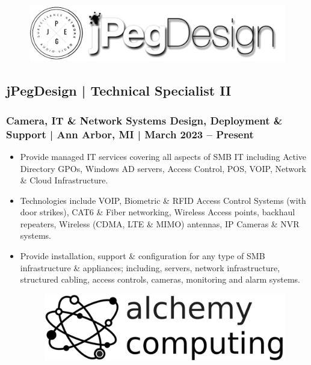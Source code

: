\documentclass[letter,10pt]{article}
\begin{document}
\begin{figure}
\includegraphics[width=0.8\linewidth]{./img/jpeg_banner.jpg}
\end{figure}

\subsection*{jPegDesign | Technical Specialist II}
\label{sec:orgf91f39a}
\subsubsection*{Camera, IT \& Network Systems Design, Deployment \& Support | Ann Arbor, MI | March 2023 – Present}
\label{sec:org804ad55}
\begin{itemize}
\item Provide managed IT services covering all aspects of SMB IT including Active Directory GPOs, Windows AD servers, Access Control, POS, VOIP, Network \& Cloud Infrastructure.
\label{sec:org9d4d0e3}
\item Technologies include VOIP, Biometric \& RFID Access Control Systems (with door strikes), CAT6 \& Fiber networking, Wireless Access points, backhaul repeaters, Wireless (CDMA, LTE \& MIMO) antennas, IP Cameras \& NVR systems.
\label{sec:org82a900c}
\item Provide installation, support \& configuration for any type of SMB infrastructure \& appliances; including, servers, network infrastructure, structured cabling, access controls, cameras, monitoring and alarm systems.
\label{sec:org6bd4999}




\begin{figure}
\includegraphics[width=0.8\linewidth]{./img/50p_alchemy_computing.jpg}
\end{figure}
\end{itemize}
\end{document}
